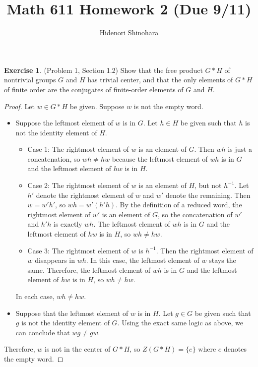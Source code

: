 \documentclass[12pt, psamsfonts]{amsart}
\theoremstyle{definition}
\newtheorem*{exer}{Exercise}
\theoremstyle{remark}
\numberwithin{equation}{section}
\begin{document}
\title{Math 611 Homework 2 (Due 9/11)}
\author{Hidenori Shinohara}
\maketitle

\begin{exer}{(Problem 1, Section 1.2)}
  Show that the free product $G * H$ of nontrivial groups $G$ and $H$ has trivial center, and that the only elements of $G * H$ of finite order are the conjugates of finite-order elements of $G$ and $H$.
\end{exer}

\begin{proof}
  Let $w \in G * H$ be given.
  Suppose $w$ is not the empty word.
  \begin{itemize}
    \item
      Suppose the leftmost element of $w$ is in $G$.
      Let $h \in H$ be given such that $h$ is not the identity element of $H$.
      \begin{itemize}
        \item
          Case 1: The rightmost element of $w$ is an element of $G$.
          Then $wh$ is just a concatenation, so $wh \ne hw$ because the leftmost element of $wh$ is in $G$ and the leftmost element of $hw$ is in $H$.
        \item
          Case 2: The rightmost element of $w$ is an element of $H$, but not $h^{-1}$.
          Let $h'$ denote the rightmost element of $w$ and $w'$ denote the remaining.
          Then $w = w'h'$, so $wh = w'(h'h)$.
          By the definition of a reduced word, the rightmost element of $w'$ is an element of $G$, so the concatenation of $w'$ and $h'h$ is exactly $wh$.
          The leftmost element of $wh$ is in $G$ and the leftmost element of $hw$ is in $H$, so $wh \ne hw$.
        \item
          Case 3: The rightmost element of $w$ is $h^{-1}$.
          Then the rightmost element of $w$ disappears in $wh$.
          In this case, the leftmost element of $w$ stays the same.
          Therefore, the leftmost element of $wh$ is in $G$ and the leftmost element of $hw$ is in $H$, so $wh \ne hw$.
      \end{itemize}
      In each case, $wh \ne hw$.
    \item
      Suppose that the leftmost element of $w$ is in $H$.
      Let $g \in G$ be given such that $g$ is not the identity element of $G$.
      Using the exact same logic as above, we can conclude that $wg \ne gw$.
  \end{itemize}
  Therefore, $w$ is not in the center of $G * H$, so $Z(G * H) = \{ e \}$ where $e$ denotes the empty word.


\end{proof}
\end{document}
